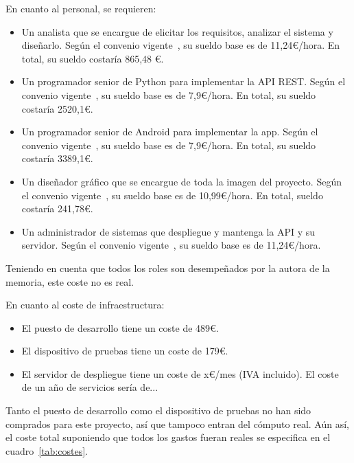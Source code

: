 En cuanto al personal, se requieren:
\begin{itemize}
\item Un analista que se encargue de elicitar los requisitos, analizar el
  sistema y diseñarlo. Según el convenio vigente~\cite{convenio}, su sueldo base
  es de 11,24€/hora. En total, su sueldo costaría 865,48 €.
\item Un programador senior de Python para implementar la API REST. Según el
  convenio vigente~\cite{convenio}, su sueldo base es de 7,9€/hora. En total, su
  sueldo costaría 2520,1€.
\item Un programador senior de Android para implementar la app. Según el
  convenio vigente~\cite{convenio}, su sueldo base es de 7,9€/hora. En total, su
  sueldo costaría 3389,1€.
\item Un diseñador gráfico que se encargue de toda la imagen del proyecto. Según
  el convenio vigente~\cite{convenio}, su sueldo base es de 10,99€/hora. En
  total, sueldo costaría 241,78€.
\item Un administrador de sistemas que despliegue y mantenga la API y su
  servidor. Según el convenio vigente~\cite{convenio}, su sueldo base es de
  11,24€/hora. 
\end{itemize}

Teniendo en cuenta que todos los roles son desempeñados por la autora de la
memoria, este coste no es real.

En cuanto al coste de infraestructura:
\begin{itemize}
\item El puesto de desarrollo tiene un coste de 489€.
\item El dispositivo de pruebas tiene un coste de 179€.
\item El servidor de despliegue tiene un coste de x€/mes (IVA incluido). El coste
  de un año de servicios sería de...
\end{itemize}

Tanto el puesto de desarrollo como el dispositivo de pruebas no han sido
comprados para este proyecto, así que tampoco entran del cómputo real. Aún así,
el coste total suponiendo que todos los gastos fueran reales se especifica en
el cuadro~\ref{tab:costes}.


